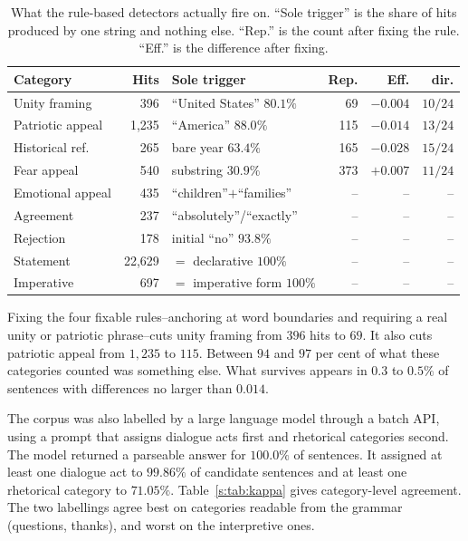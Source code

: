 \documentclass[pdflatex,sn-apa]{sn-jnl}%
\begin{document}
\begin{table}[!htbp]
\caption{What the rule-based detectors actually fire on. ``Sole trigger'' is
the share of hits produced by one string and nothing else. ``Rep.'' is the
count after fixing the rule. ``Eff.'' is the difference after fixing.}
\label{s:tab:regex}
\centering
\footnotesize
\setlength{\tabcolsep}{2pt}
\begin{tabular}{lrlrrr}
\toprule
Category & Hits & Sole trigger & Rep. & Eff. & dir. \\
\midrule
Unity framing     & 396   & ``United States'' $80.1\%$ & 69  & $-0.004$ & $10/24$ \\
Patriotic appeal  & 1{,}235 & ``America'' $88.0\%$     & 115 & $-0.014$ & $13/24$ \\
Historical ref.   & 265   & bare year $63.4\%$         & 165 & $-0.028$ & $15/24$ \\
Fear appeal       & 540   & substring $30.9\%$         & 373 & $+0.007$ & $11/24$ \\
Emotional appeal  & 435   & ``children''$+$``families'' & -- & -- & -- \\
Agreement         & 237   & ``absolutely''/``exactly'' & -- & -- & -- \\
Rejection         & 178   & initial ``no'' $93.8\%$    & -- & -- & -- \\
Statement         & 22{,}629 & $=$ declarative $100\%$ & -- & -- & -- \\
Imperative        & 697 & $=$ imperative form $100\%$  & -- & -- & -- \\
\bottomrule
\end{tabular}
\end{table}

Fixing the four fixable rules--anchoring at word boundaries and requiring a
real unity or patriotic phrase--cuts unity framing from $396$ hits to $69$.
It also cuts patriotic appeal from $1{,}235$ to $115$. Between $94$ and $97$
per cent of what these categories counted was something else. What survives
appears in $0.3$ to $0.5\%$ of sentences with differences no larger than
$0.014$.

The corpus was also labelled by a large language model through a batch API,
using a prompt that assigns dialogue acts first and rhetorical categories
second. The model returned a parseable answer for $100.0\%$ of sentences. It
assigned at least one dialogue act to $99.86\%$ of candidate sentences and
at least one rhetorical category to $71.05\%$. Table~\ref{s:tab:kappa} gives
category-level agreement. The two labellings agree best on categories
readable from the grammar (questions, thanks), and worst on the
interpretive ones.
\end{document}
